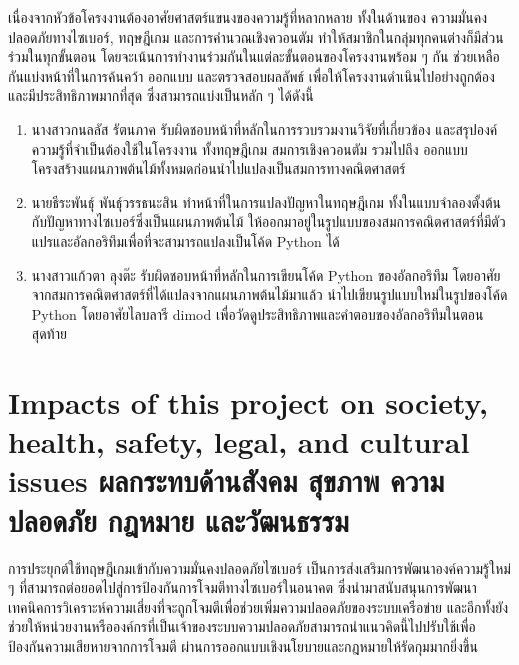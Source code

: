 เนื่องจากหัวข้อโครงงานต้องอาศัยศาสตร์แขนงของความรู้ที่หลากหลาย ทั้งในด้านของ ความมั่นคงปลอดภัยทางไซเบอร์, ทฤษฎีเกม และการคำนวณเชิงควอนตัม ทำให้สมาชิกในกลุ่มทุกคนต่างก็มีส่วนร่วมในทุกขั้นตอน โดยจะเน้นการทำงานร่วมกันในแต่ละขั้นตอนของโครงงานพร้อม ๆ กัน ช่วยเหลือกันแบ่งหน้าที่ในการค้นคว้า ออกแบบ และตรวจสอบผลลัพธ์ เพื่อให้โครงงานดำเนินไปอย่างถูกต้องและมีประสิทธิภาพมากที่สุด ซึ่งสามารถแบ่งเป็นหลัก ๆ ได้ดังนี้
\begin{enumerate}
\item นางสาวกนลลัส รัตนภาค รับผิดชอบหน้าที่หลักในการรวบรวมงานวิจัยที่เกี่ยวข้อง และสรุปองค์ความรู้ที่จำเป็นต้องใช้ในโครงงาน ทั้งทฤษฎีเกม สมการเชิงควอนตัม รวมไปถึง ออกแบบโครงสร้างแผนภาพต้นไม้ทั้งหมดก่อนนำไปแปลงเป็นสมการทางคณิตศาสตร์

\item นายธีระพันธุ์ พันธุ์วรรธนะสิน ทำหน้าที่ในการแปลงปัญหาในทฤษฎีเกม ทั้งในแบบจำลองตั้งต้นกับปัญหาทางไซเบอร์ซึ่งเป็นแผนภาพต้นไม้ ให้ออกมาอยู่ในรูปแบบของสมการคณิตศาสตร์ที่มีตัวแปรและอัลกอริทึมเพื่อที่จะสามารถแปลงเป็นโค้ด Python ได้
\item นางสาวแก้วตา ลุงต๊ะ รับผิดชอบหน้าที่หลักในการเขียนโค้ด Python ของอัลกอริทึม โดยอาศัยจากสมการคณิตศาสตร์ที่ได้แปลงจากแผนภาพต้นไม้มาแล้ว นำไปเขียนรูปแบบใหม่ในรูปของโค้ด Python โดยอาศัยไลบลารี dimod เพื่อวัดดูประสิทธิภาพและคำตอบของอัลกอริทึมในตอนสุดท้าย
\end{enumerate}

\section{\ifenglish%
Impacts of this project on society, health, safety, legal, and cultural issues
\else%
ผลกระทบด้านสังคม สุขภาพ ความปลอดภัย กฎหมาย และวัฒนธรรม
\fi}

การประยุกต์ใช้ทฤษฎีเกมเข้ากับความมั่นคงปลอดภัยไซเบอร์ เป็นการส่งเสริมการพัฒนาองค์ความรู้ใหม่ ๆ ที่สามารถต่อยอดไปสู่การป้องกันการโจมตีทางไซเบอร์ในอนาคต ซึ่งนำมาสนับสนุนการพัฒนาเทคนิคการวิเคราะห์ความเสี่ยงที่จะถูกโจมตีเพื่อช่วยเพิ่มความปลอดภัยของระบบเครือข่าย และอีกทั้งยังช่วยให้หน่วยงานหรือองค์กรที่เป็นเจ้าของระบบความปลอดภัยสามารถนำแนวคิดนี้ไปปรับใช้เพื่อป้องกันความเสียหายจากการโจมตี ผ่านการออกแบบเชิงนโยบายและกฎหมายให้รัดกุมมากยิ่งขึ้น

